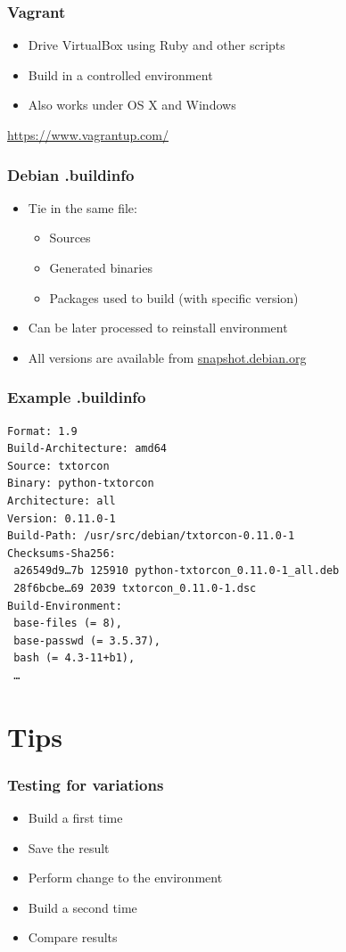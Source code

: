 \documentclass[14pt,aspectratio=169]{beamer}
\begin{document}
\begin{frame}
 \frametitle{Vagrant}

 \begin{itemize}
  \item Drive VirtualBox using Ruby and other scripts
  \item Build in a controlled environment
  \item Also works under OS X and Windows
 \end{itemize}

 \vfill
 {\footnotesize
 \url{https://www.vagrantup.com/}
 }
\end{frame}

\begin{frame}
 \frametitle{Debian .buildinfo}

 \begin{itemize}
  \item Tie in the same file:
   \begin{itemize}
    \item Sources
    \item Generated binaries
    \item Packages used to build (with specific version)
   \end{itemize}
  \item Can be later processed to reinstall environment
  \item All versions are available from \url{snapshot.debian.org}
 \end{itemize}
\end{frame}

\begin{frame}[fragile]
 \frametitle{Example .buildinfo}

{\small
\begin{verbatim}
Format: 1.9
Build-Architecture: amd64
Source: txtorcon
Binary: python-txtorcon
Architecture: all
Version: 0.11.0-1
Build-Path: /usr/src/debian/txtorcon-0.11.0-1
Checksums-Sha256:
 a26549d9…7b 125910 python-txtorcon_0.11.0-1_all.deb
 28f6bcbe…69 2039 txtorcon_0.11.0-1.dsc
Build-Environment:
 base-files (= 8),
 base-passwd (= 3.5.37),
 bash (= 4.3-11+b1),
 …
\end{verbatim}
}
\end{frame}

\section{Tips}

\begin{frame}
 \frametitle{Testing for variations}

 \begin{itemize}
  \item Build a first time
  \item Save the result
  \item Perform change to the environment
  \item Build a second time
  \item Compare results
 \end{itemize}
\end{frame}
\end{document}
